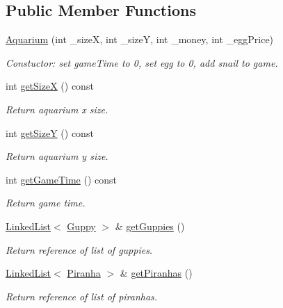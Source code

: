 \subsection*{Public Member Functions}
\begin{DoxyCompactItemize}
\item 
\mbox{\hyperlink{class_aquarium_a62a4dae7e6f07cb1b753ac87c0dd90e0}{Aquarium}} (int \+\_\+sizeX, int \+\_\+sizeY, int \+\_\+money, int \+\_\+egg\+Price)
\begin{DoxyCompactList}\small\item\em Constuctor\+: set game\+Time to 0, set egg to 0, add snail to game. \end{DoxyCompactList}\item 
int \mbox{\hyperlink{class_aquarium_ab81986af33708a95c309a10a0f317058}{get\+SizeX}} () const
\begin{DoxyCompactList}\small\item\em Return aquarium x size. \end{DoxyCompactList}\item 
int \mbox{\hyperlink{class_aquarium_a0384a8e32a1e61baf38e09925ffaed96}{get\+SizeY}} () const
\begin{DoxyCompactList}\small\item\em Return aquarium y size. \end{DoxyCompactList}\item 
int \mbox{\hyperlink{class_aquarium_aac0206880d410aec571cfc10b8ceae46}{get\+Game\+Time}} () const
\begin{DoxyCompactList}\small\item\em Return game time. \end{DoxyCompactList}\item 
\mbox{\hyperlink{class_linked_list}{Linked\+List}}$<$ \mbox{\hyperlink{class_guppy}{Guppy}} $>$ \& \mbox{\hyperlink{class_aquarium_a9214dfeb37c333eb3f95f8fc50adb933}{get\+Guppies}} ()
\begin{DoxyCompactList}\small\item\em Return reference of list of guppies. \end{DoxyCompactList}\item 
\mbox{\hyperlink{class_linked_list}{Linked\+List}}$<$ \mbox{\hyperlink{class_piranha}{Piranha}} $>$ \& \mbox{\hyperlink{class_aquarium_af6c1da11d3952590634655e81d9a4eba}{get\+Piranhas}} ()
\begin{DoxyCompactList}\small\item\em Return reference of list of piranhas. \end{DoxyCompactList}\item 

\end{DoxyCompactItemize}
